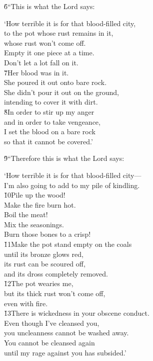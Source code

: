 \v{6}``This is what the Lord  says:

\begin{poetry}
\poeml `How terrible it is for that blood-filled city, \\
\poemll    to the pot whose rust remains in it, \\
\poemlll       whose rust won't come off. \\
\poeml Empty it one piece at a time. \\
\poemll    Don't let a lot fall on it. \\
\poeml \v{7}Her blood was in it. \\
\poemll    She poured it out onto bare rock. \\
\poeml She didn't pour it out on the ground, \\
\poemll    intending to cover it with dirt. \\
\poeml \v{8}In order to stir up my anger \\
\poemll    and in order to take vengeance, \\
\poeml I set the blood on a bare rock \\
\poemll    so that it cannot be covered.'
\end{poetry}

\v{9}``Therefore this is what the Lord  says:

\begin{poetry}
\poeml `How terrible it is for that blood-filled city--- \\
\poemll    I'm also going to add to my pile of kindling. \\
\poeml \v{10}Pile up the wood! \\
\poemll    Make the fire burn hot. \\
\poeml Boil the meat! \\
\poemll    Mix the seasonings. \\
\poeml Burn those bones to a crisp! \\
\poeml \v{11}Make the pot stand empty on the coals \\
\poemll    until its bronze glows red, \\
\poeml its rust can be scoured off, \\
\poemll    and its dross completely removed. \\
\poeml \v{12}The pot wearies me, \\
\poemll    but its thick rust won't come off, \\
\poemlll       even with fire. \\
\poeml \v{13}There is wickedness in your obscene conduct. \\
\poemll    Even though I've cleansed you, \\
\poemlll       you uncleanness cannot be washed away. \\
\poeml You cannot be cleansed again \\
\poemll    until my rage against you has subsided.'
\end{poetry}

